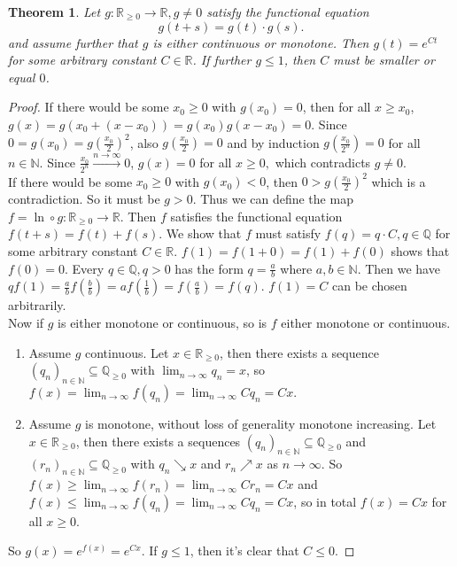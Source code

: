 \documentclass[12pt,a4paper]{scrartcl}
\newtheorem{theorem}{Theorem}[section]
\numberwithin{equation}{section}
\newcommand{\R}{\mathbb{R}} %
\newcommand{\Q}{\mathbb{Q}} %
\newcommand{\N}{\mathbb{N}} %
\begin{document}
\begin{theorem} \label{th:excauchyfunceq}
Let $g:\R_{\geq 0} \to \R, g \neq 0$ satisfy the functional equation
\begin{equation}
g\left(t+s\right) = g\left(t\right) \cdot g\left(s\right).
\end{equation} 
and assume further that $g$ is either continuous or monotone.
Then $g\left(t\right) = e^{Ct}$ for some arbitrary constant $C \in \R$. If further $g \leq 1$, then $C$ must be smaller or equal $0$.
\end{theorem}
\begin{proof}
If there would be some $x_0 \geq 0$ with $g\left(x_0\right) = 0$, then for all $x \geq x_0$, $g\left(x\right) = g\left(x_0 + \left(x - x_0\right)\right) = g\left(x_0\right) g\left(x-x_0\right) = 0.$ Since $0 = g\left(x_0\right) = g\left(\frac{x_0}{2}\right)^2$, also $g\left(\frac{x_0}{2}\right) = 0$ and by induction $g\left(\frac{x_0}{2^n}\right) = 0$ for all $n \in \N.$ Since $\frac{x_0}{2^n} \overset{n \to \infty}{\to} 0$, $g\left(x\right) = 0$ for all $x \geq 0,$ which contradicts $g \neq 0.$\\
If there would be some $x_0 \geq 0$ with $g\left(x_0\right) < 0$, then $0 > g\left(\frac{x_0}{2}\right)^2$ which is a contradiction. So it must be $g > 0.$
Thus we can define the map $ f = \ln \circ g:\R_{\geq 0} \to \R $. Then $f$ satisfies the functional equation $f\left(t+s\right) = f\left(t\right) + f\left(s\right).$
We show that $f$ must satisfy $f\left(q\right) = q \cdot C , q \in \Q$ for some arbitrary constant $C \in \R$.
$f\left(1\right) = f\left(1+0\right) = f\left(1\right) + f\left(0\right)$ shows that $f\left(0\right) = 0.$
Every $q \in \Q, q > 0$ has the form $q = \frac{a}{b}$ where $a,b \in \N.$ Then we have $q f\left(1\right) = \frac{a}{b} f\left(\frac{b}{b}\right) = a f\left(\frac{1}{b}\right) = f\left(\frac{a}{b}\right) = f\left(q\right).$
$f\left(1\right) = C$ can be chosen arbitrarily. \\
Now if $g$ is either monotone or continuous, so is $f$ either monotone or continuous.
\begin{enumerate}
\item Assume $g$ continuous. Let $x \in \R_{\geq 0}$, then there exists a sequence $\left(q_n\right)_{n \in \N} \subseteq \Q_{\geq 0}$ with $\lim_{n \to \infty} q_n = x$, so $f\left(x\right) = \lim_{n \to \infty} f\left(q_n\right) = \lim_{n \to \infty} C q_n = Cx.$
\item Assume $g$ is monotone, without loss of generality monotone increasing. Let  $x \in \R_{\geq 0}$, then there exists a sequences $\left(q_n\right)_{n \in \N} \subseteq \Q_{\geq 0}$ and $\left(r_n\right)_{n \in \N} \subseteq \Q_{\geq 0}$ with $ q_n \searrow x$ and $r_n\nearrow x$ as $n \to \infty.$ So $f\left(x\right) \geq \lim_{n \to \infty} f\left(r_n\right) = \lim_{n \to \infty} C r_n = C x$ and $f\left(x\right) \leq \lim_{n \to \infty} f\left(q_n\right) = \lim_{n \to \infty} C q_n = C x$, so in total $f\left(x\right) = C x$ for all $ x \geq 0.$
\end{enumerate}
So $g\left(x\right) = e^{f\left(x\right)} = e^{Cx}.$
If $g \leq 1$, then it's clear that $C \leq 0.$
  
\end{proof}
\end{document}
